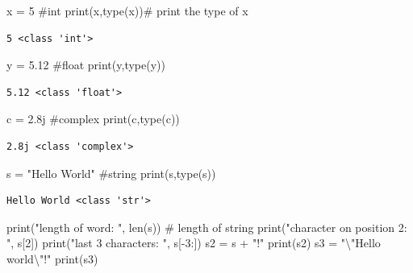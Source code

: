 \documentclass[
  letterpaper,
  DIV=11,
  numbers=noendperiod]{scrreprt}
\newenvironment{Shaded}{\begin{snugshade}}{\end{snugshade}}
\newcommand{\BuiltInTok}[1]{\textcolor[rgb]{0.00,0.23,0.31}{#1}}
\newcommand{\CharTok}[1]{\textcolor[rgb]{0.13,0.47,0.30}{#1}}
\newcommand{\CommentTok}[1]{\textcolor[rgb]{0.37,0.37,0.37}{#1}}
\newcommand{\DecValTok}[1]{\textcolor[rgb]{0.68,0.00,0.00}{#1}}
\newcommand{\FloatTok}[1]{\textcolor[rgb]{0.68,0.00,0.00}{#1}}
\newcommand{\NormalTok}[1]{\textcolor[rgb]{0.00,0.23,0.31}{#1}}
\newcommand{\OperatorTok}[1]{\textcolor[rgb]{0.37,0.37,0.37}{#1}}
\newcommand{\OtherTok}[1]{\textcolor[rgb]{0.00,0.23,0.31}{#1}}
\newcommand{\StringTok}[1]{\textcolor[rgb]{0.13,0.47,0.30}{#1}}
\begin{document}
\begin{Shaded}
\begin{Highlighting}[]
\NormalTok{x }\OperatorTok{=} \DecValTok{5} \CommentTok{\#int}
\BuiltInTok{print}\NormalTok{(x,}\BuiltInTok{type}\NormalTok{(x))}\CommentTok{\# print the type of x}
\end{Highlighting}
\end{Shaded}

\begin{verbatim}
5 <class 'int'>
\end{verbatim}

\begin{Shaded}
\begin{Highlighting}[]
\NormalTok{y }\OperatorTok{=} \FloatTok{5.12} \CommentTok{\#float}
\BuiltInTok{print}\NormalTok{(y,}\BuiltInTok{type}\NormalTok{(y))}
\end{Highlighting}
\end{Shaded}

\begin{verbatim}
5.12 <class 'float'>
\end{verbatim}

\begin{Shaded}
\begin{Highlighting}[]
\NormalTok{c }\OperatorTok{=} \OtherTok{2.8j} \CommentTok{\#complex}
\BuiltInTok{print}\NormalTok{(c,}\BuiltInTok{type}\NormalTok{(c))}
\end{Highlighting}
\end{Shaded}

\begin{verbatim}
2.8j <class 'complex'>
\end{verbatim}

\begin{Shaded}
\begin{Highlighting}[]
\NormalTok{s }\OperatorTok{=} \StringTok{"Hello World"} \CommentTok{\#string}
\BuiltInTok{print}\NormalTok{(s,}\BuiltInTok{type}\NormalTok{(s))}
\end{Highlighting}
\end{Shaded}

\begin{verbatim}
Hello World <class 'str'>
\end{verbatim}

\begin{Shaded}
\begin{Highlighting}[]
\BuiltInTok{print}\NormalTok{(}\StringTok{"length of word: "}\NormalTok{, }\BuiltInTok{len}\NormalTok{(s)) }\CommentTok{\# length of string}
\BuiltInTok{print}\NormalTok{(}\StringTok{"character on position 2: "}\NormalTok{, s[}\DecValTok{2}\NormalTok{]) }
\BuiltInTok{print}\NormalTok{(}\StringTok{"last 3 characters: "}\NormalTok{, s[}\OperatorTok{{-}}\DecValTok{3}\NormalTok{:])}
\NormalTok{s2 }\OperatorTok{=}\NormalTok{ s }\OperatorTok{+} \StringTok{"!"}
\BuiltInTok{print}\NormalTok{(s2)}
\NormalTok{s3 }\OperatorTok{=} \StringTok{"}\CharTok{\textbackslash{}"}\StringTok{Hello world}\CharTok{\textbackslash{}"}\StringTok{!"}
\BuiltInTok{print}\NormalTok{(s3)}
\end{Highlighting}
\end{Shaded}
\end{document}
